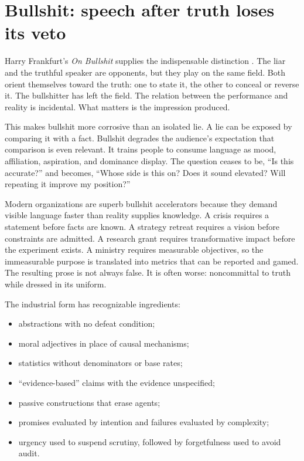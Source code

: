 ﻿\documentclass[12pt,a4paper]{book}
\begin{document}
\section{Bullshit: speech after truth loses its veto}

Harry Frankfurt's \emph{On Bullshit} supplies the indispensable distinction \cite{Frankfurt-OnBullshit}. The liar and the truthful speaker are opponents, but they play on the same field. Both orient themselves toward the truth: one to state it, the other to conceal or reverse it. The bullshitter has left the field. The relation between the performance and reality is incidental. What matters is the impression produced.

This makes bullshit more corrosive than an isolated lie. A lie can be exposed by comparing it with a fact. Bullshit degrades the audience's expectation that comparison is even relevant. It trains people to consume language as mood, affiliation, aspiration, and dominance display. The question ceases to be, “Is this accurate?” and becomes, “Whose side is this on? Does it sound elevated? Will repeating it improve my position?”

Modern organizations are superb bullshit accelerators because they demand visible language faster than reality supplies knowledge. A crisis requires a statement before facts are known. A strategy retreat requires a vision before constraints are admitted. A research grant requires transformative impact before the experiment exists. A ministry requires measurable objectives, so the immeasurable purpose is translated into metrics that can be reported and gamed. The resulting prose is not always false. It is often worse: noncommittal to truth while dressed in its uniform.

The industrial form has recognizable ingredients:

\begin{itemize}
  \item abstractions with no defeat condition;
  \item moral adjectives in place of causal mechanisms;
  \item statistics without denominators or base rates;
  \item “evidence-based” claims with the evidence unspecified;
  \item passive constructions that erase agents;
  \item promises evaluated by intention and failures evaluated by complexity;
  \item urgency used to suspend scrutiny, followed by forgetfulness used to avoid audit.
\end{itemize}
\end{document}
